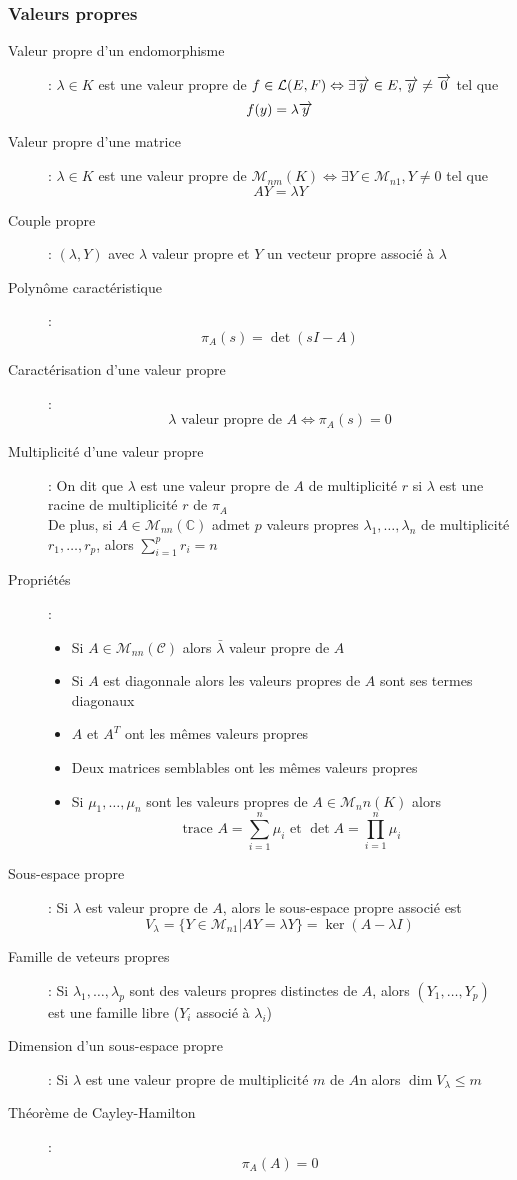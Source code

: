 \subsubsection{Valeurs propres}
\begin{description}
\item[Valeur propre d'un endomorphisme] : $\lambda\in K$ est une valeur propre de $f\in\mathcal L(E,F)\Leftrightarrow\exists\overrightarrow{y}\in E, \overrightarrow{y}\ne\overrightarrow{0}$ tel que
    \[ f(y)=\lambda\overrightarrow{y} \]
\item[Valeur propre d'une matrice] : $\lambda\in K$ est une valeur propre de $\mathcal M_{nm}(K)\Leftrightarrow\exists Y\in\mathcal M_{n1}, Y\ne 0$ tel que
    \[ AY=\lambda Y \]
\item[Couple propre] : $(\lambda, Y)$ avec $\lambda$ valeur propre et $Y$ un vecteur propre associé à $\lambda$
\item[Polynôme caractéristique] : \[ \pi_A(s)=\det(sI-A) \]
\item[Caractérisation d'une valeur propre] : 
    \[ \lambda\textrm{ valeur propre de } A\Leftrightarrow \pi_A(s)=0 \]
\item[Multiplicité d'une valeur propre] : 
    On dit que $\lambda$ est une valeur propre de $A$ de multiplicité $r$ si $\lambda$ est une racine de multiplicité $r$ de $\pi_A$\\
    De plus, si $A\in\mathcal M_{nn}(\mathbb C)$ admet $p$ valeurs propres $\lambda_1,\dots,\lambda_n$ de multiplicité $r_1,\dots,r_p$, alors
    $\sum_{i=1}^pr_i=n$
\item[Propriétés] :
\begin{itemize}
    \item Si $A\in\mathcal M_{nn}(\mathcal C)$ alors $\bar\lambda$ valeur propre de $A$
    \item Si $A$ est diagonnale alors les valeurs propres de $A$ sont ses termes diagonaux
    \item $A$ et $A^T$ ont les mêmes valeurs propres
    \item Deux matrices semblables ont les mêmes valeurs propres
    \item Si $\mu_1,\dots,\mu_n$ sont les valeurs propres de $A\in\mathcal M_nn(K)$ alors
        \[ \textrm{trace }A = \sum_{i=1}^n\mu_i\textrm{ et }\det A = \prod_{i=1}^n\mu_i \]
\end{itemize}
\item[Sous-espace propre] : Si $\lambda$ est valeur propre de $A$, alors le sous-espace propre associé est 
    \[ V_{\lambda}=\{Y\in\mathcal M_{n1} | AY=\lambda Y \}=\ker (A-\lambda I) \]
\item[Famille de veteurs propres] : Si $\lambda_1,\dots, \lambda_p$ sont des valeurs propres distinctes de $A$, alors $(Y_1,\dots,Y_p)$ est une famille libre
    ($Y_i$ associé à $\lambda_i$)
\item[Dimension d'un sous-espace propre] : Si $\lambda$ est une valeur propre de multiplicité $m$ de $A$n alors $\dim V_\lambda\le m$
\item[Théorème de Cayley-Hamilton] : \[ \pi_A(A)=0 \]
\end{description}
